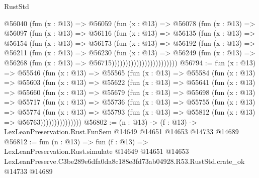 \begin{lexlean}{RustStd}
\begin{coremodule}
                        @56040
                          (fun (x : @13) =>
                          @56059
                            (fun (x : @13) =>
                            @56078
                              (fun (x : @13) =>
                              @56097
                                (fun (x : @13) =>
                                @56116
                                  (fun (x : @13) =>
                                  @56135
                                    (fun (x : @13) =>
                                    @56154
                                      (fun (x : @13) =>
                                      @56173
                                        (fun (x : @13) =>
                                        @56192
                                          (fun (x : @13) =>
                                          @56211
                                            (fun (x : @13) =>
                                            @56230
                                              (fun (x : @13) =>
                                              @56249
                                                (fun (x : @13) =>
                                                @56268
                                                  (fun (x : @13) => @56715))))))))))))))))))))))))
@56794 := fun (x : @13) =>
  @55546
    (fun (x : @13) =>
    @55565
      (fun (x : @13) =>
      @55584
        (fun (x : @13) =>
        @55603
          (fun (x : @13) =>
          @55622
            (fun (x : @13) =>
            @55641
              (fun (x : @13) =>
              @55660
                (fun (x : @13) =>
                @55679
                  (fun (x : @13) =>
                  @55698
                    (fun (x : @13) =>
                    @55717
                      (fun (x : @13) =>
                      @55736
                        (fun (x : @13) =>
                        @55755
                          (fun (x : @13) =>
                          @55774
                            (fun (x : @13) =>
                            @55793 (fun (x : @13) => @55812 (fun (x : @13) => @56763)))))))))))))))
@56802 := (n : @13) ->
  (f : @13) -> LexLeanPreservation.Rust.FunSem @14649 @14651 @14653 @14733 @14689
@56812 := fun (n : @13) =>
  fun (f : @13) =>
  LexLeanPreservation.Rust.simulate
    @14649
    @14651
    @14653
    LexLeanPreserve.C3be289e6dfa0da8c188e3fd73ab04928.R53.RustStd.crate_ok
    @14733
    @14689
\end{coremodule}
\end{lexlean}
